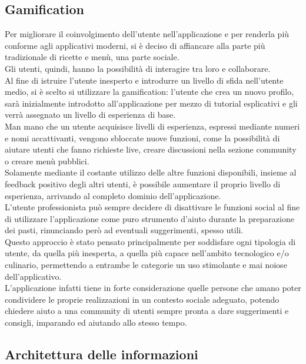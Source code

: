 \subsection{Gamification}
Per migliorare il coinvolgimento dell'utente nell'applicazione e per renderla più conforme agli applicativi moderni, si è deciso di affiancare alla parte più tradizionale di ricette e menù, una parte sociale.\\
Gli utenti, quindi, hanno la possibilità di interagire tra loro e collaborare.\\
Al fine di istruire l'utente inesperto e introdurre un livello di sfida nell'utente medio, si è scelto si utilizzare la gamification:
l'utente che crea un nuovo profilo, sarà inizialmente introdotto all'applicazione per mezzo di tutorial esplicativi e gli verrà assegnato un livello di esperienza di base.\\
Man mano che un utente acquisisce livelli di esperienza, espressi mediante numeri e nomi accattivanti, vengono sbloccate nuove funzioni, come la possibilità di aiutare utenti che fanno richieste live, creare discussioni nella sezione community o creare menù pubblici.\\
Solamente mediante il costante utilizzo delle altre funzioni disponibili, insieme al feedback positivo degli altri utenti, è possibile aumentare il proprio livello di esperienza, arrivando al completo dominio dell'applicazione.\\
L'utente professionista può sempre decidere di disattivare le funzioni social al fine di utilizzare l'applicazione come puro strumento d'aiuto durante la preparazione dei pasti, rinunciando però ad eventuali suggerimenti, spesso utili.\\
Questo approccio è stato pensato principalmente per soddisfare ogni tipologia di utente, da quella più inesperta, a quella più capace nell'ambito tecnologico e/o culinario, permettendo a entrambe le categorie un uso stimolante e mai noiose dell'applicativo.\\
L’applicazione infatti tiene in forte considerazione quelle persone che amano poter condividere le proprie realizzazioni in un contesto sociale adeguato, potendo chiedere aiuto a una community di utenti sempre pronta a dare suggerimenti e consigli, imparando ed aiutando allo stesso tempo.


\subsection{Architettura delle informazioni}


